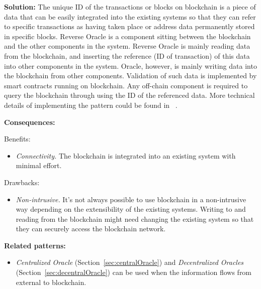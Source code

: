 \vspace{0.5em}\noindent \textbf{Solution:} 
The unique ID of the transactions or blocks on blockchain is a piece of data that can be easily integrated into the existing systems so that they can refer to specific transactions as having taken place or address data permanently stored in specific blocks. Reverse Oracle is a component sitting between the blockchain and the other components in the system. Reverse Oracle is mainly reading data from the blockchain, and inserting the reference (ID of transaction) of this data into other components in the system. Oracle, however, is mainly writing data into the blockchain from other components. Validation of such data is implemented by smart contracts running on blockchain. Any off-chain component is required to query the blockchain through using the ID of the referenced data. More technical details of implementing the pattern could be found in ~\cite{2020-Muehlberger-BPM-BC}. 


\vspace{0.5em}\noindent \textbf{Consequences:} 

Benefits:
\begin{itemize}
  \item \textit{Connectivity.} The blockchain is integrated into an existing system with minimal effort.
\end{itemize}

Drawbacks: 
\begin{itemize}
   \item \textit{Non-intrusive.} It's not always possible to use blockchain in a non-intrusive way depending on the extensibility of the existing systems. Writing to and reading from the blockchain might need changing the existing system so that they can securely access the blockchain network.
\end{itemize}


\vspace{0.5em}\noindent \textbf{Related patterns:} 
\begin{itemize}
    \item \textit{Centralized Oracle} (Section~\ref{sec:centralOracle}) and \textit{Decentralized Oracles} (Section~\ref{sec:decentralOracle}) can be used when the information flows from external to blockchain.
\end{itemize}

